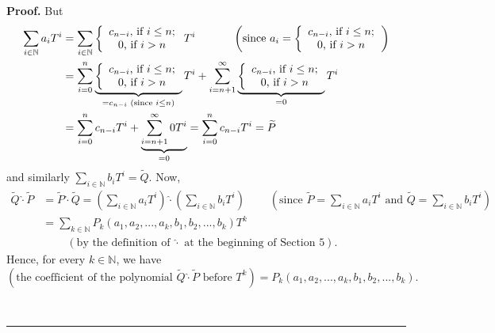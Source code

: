 \documentclass[numbers=enddot,12pt,final,onecolumn,notitlepage]{scrartcl}%
\newenvironment{proof}[1][Proof]{\noindent\textbf{#1.} }{\ \rule{0.5em}{0.5em}}
\begin{document}
\begin{proof}
But%
\begin{align*}
\sum\limits_{i\in\mathbb{N}}a_{i}T^{i}  &  =\sum\limits_{i\in\mathbb{N}%
}\left\{
\begin{array}
[c]{c}%
c_{n-i}\text{, if }i\leq n;\\
0\text{, if }i>n
\end{array}
\right.  T^{i}\ \ \ \ \ \ \ \ \ \ \left(  \text{since }a_{i}=\left\{
\begin{array}
[c]{c}%
c_{n-i}\text{, if }i\leq n;\\
0\text{, if }i>n
\end{array}
\right.  \right) \\
&  =\sum\limits_{i=0}^{n}\underbrace{\left\{
\begin{array}
[c]{c}%
c_{n-i}\text{, if }i\leq n;\\
0\text{, if }i>n
\end{array}
\right.  }_{=c_{n-i}\text{ (since }i\leq n\text{)}}T^{i}+\sum\limits_{i=n+1}%
^{\infty}\underbrace{\left\{
\begin{array}
[c]{c}%
c_{n-i}\text{, if }i\leq n;\\
0\text{, if }i>n
\end{array}
\right.  }_{=0}T^{i}\\
&  =\sum\limits_{i=0}^{n}c_{n-i}T^{i}+\underbrace{\sum\limits_{i=n+1}^{\infty
}0T^{i}}_{=0}=\sum\limits_{i=0}^{n}c_{n-i}T^{i}=\widetilde{P}%
\end{align*}
and similarly $\sum\limits_{i\in\mathbb{N}}b_{i}T^{i}=\widetilde{Q}$. Now,%
\begin{align*}
\widetilde{Q}\widehat{\cdot}\widetilde{P}  &  =\widetilde{P}\widehat{\cdot
}\widetilde{Q}=\left(  \sum\limits_{i\in\mathbb{N}}a_{i}T^{i}\right)
\widehat{\cdot}\left(  \sum\limits_{i\in\mathbb{N}}b_{i}T^{i}\right)
\ \ \ \ \ \ \ \ \ \ \left(  \text{since }\widetilde{P}=\sum\limits_{i\in
\mathbb{N}}a_{i}T^{i}\text{ and }\widetilde{Q}=\sum\limits_{i\in\mathbb{N}%
}b_{i}T^{i}\right) \\
&  =\sum_{k\in\mathbb{N}}P_{k}\left(  a_{1},a_{2},...,a_{k},b_{1}%
,b_{2},...,b_{k}\right)  T^{k}\\
&  \ \ \ \ \ \ \ \ \ \ \left(  \text{by the definition of }\widehat{\cdot
}\text{ at the beginning of Section 5}\right)  .
\end{align*}
Hence, for every $k\in\mathbb{N}$, we have%
\[
\left(  \text{the coefficient of the polynomial }\widetilde{Q}\widehat{\cdot
}\widetilde{P}\text{ before }T^{k}\right)  =P_{k}\left(  a_{1},a_{2}%
,...,a_{k},b_{1},b_{2},...,b_{k}\right)  .
\]



\end{proof}
\end{document}
